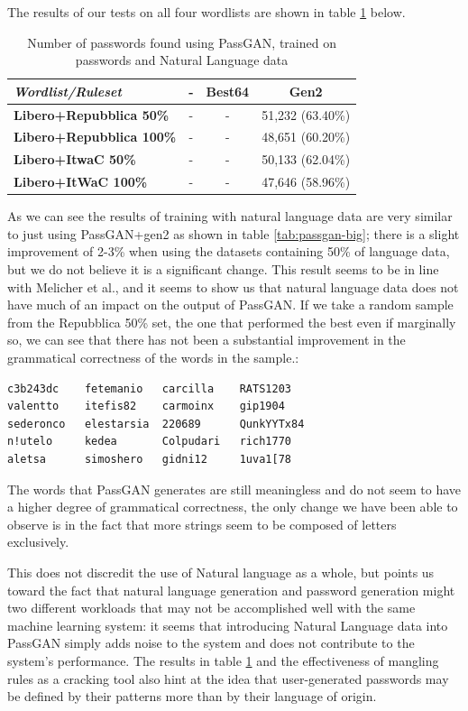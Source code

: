 The results of our tests on all four wordlists are shown in table \ref{tab:nl-results} below.

\begin{table}[H]
\centering
\begin{tabular}{|l|c|c|c|}
\hline
 \textbf{\emph{Wordlist/Ruleset}} & \textbf{-} & \textbf{Best64} & \textbf{Gen2} \\ \hline
 \textbf{Libero+Repubblica 50\%} & - & - & 51,232 (63.40\%) \\ \hline
 \textbf{Libero+Repubblica 100\%} & - & - &  48,651 (60.20\%) \\ \hline
 \textbf{Libero+ItwaC 50\%} & - & - &  50,133 (62.04\%) \\ \hline
 \textbf{Libero+ItWaC 100\%} & - & - &  47,646 (58.96\%) \\ \hline
\end{tabular}
\caption{Number of passwords found using PassGAN, trained on passwords and Natural Language data}
\label{tab:nl-results}
\end{table}

As we can see the results of training with natural language data are very similar to just using PassGAN+gen2 as shown in table \ref{tab:passgan-big}; there is a slight improvement of 2-3\% when using the datasets containing 50\% of language data, but we do not believe it is a significant change. This result seems to be in line with Melicher et al.\cite{Melicher2016}, and it seems to show us that natural language data does not have much of an impact on the output of PassGAN. 
If we take a random sample from the Repubblica 50\% set, the one that performed the best even if marginally so, we can see that there has not been a substantial improvement in the grammatical correctness of the words in the sample.:
\begin{verbatim}
c3b243dc    fetemanio   carcilla    RATS1203
valentto    itefis82    carmoinx    gip1904
sederonco   elestarsia  220689      QunkYYTx84
n!utelo     kedea       Colpudari   rich1770
aletsa      simoshero   gidni12     1uva1[78
\end{verbatim}    

The words that PassGAN generates are still meaningless and do not seem to have a higher degree of grammatical correctness, the only change we have been able to observe is in the fact that more strings seem to be composed of letters exclusively.

This does not discredit the use of Natural language as a whole, but points us toward the fact that natural language generation and password generation might two different workloads that may not be accomplished well with the same machine learning system: it seems that introducing Natural Language data into PassGAN simply adds noise to the system and does not contribute to the system's performance.
The results in table \ref{tab:nl-results} and the effectiveness of mangling rules as a cracking tool also hint at the idea that user-generated passwords may be defined by their patterns more than by their language of origin.
